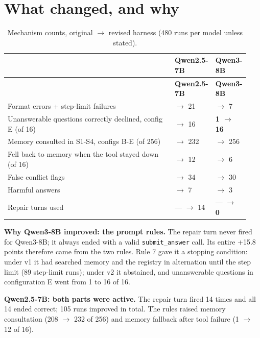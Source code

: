 \documentclass[10.5pt,a4paper,oneside]{report}
\begin{document}
\section{What changed, and why}
\begingroup\small\setlength{\tabcolsep}{4pt}\renewcommand{\arraystretch}{1.18}
\begin{longtable}{>{\raggedright\arraybackslash}p{0.693\linewidth}>{\raggedright\arraybackslash}p{0.130\linewidth}>{\raggedright\arraybackslash}p{0.118\linewidth}}
\caption{Mechanism counts, original $\rightarrow$ revised harness (480 runs per model unless stated).}\\
\toprule
\textbf{} & \textbf{Qwen2.5-7B} & \textbf{Qwen3-8B} \\
\midrule
\endfirsthead
\toprule
\textbf{} & \textbf{Qwen2.5-7B} & \textbf{Qwen3-8B} \\
\midrule
\endhead
\bottomrule
\endlastfoot
Format errors + step-limit failures & 104 $\rightarrow$ 21 & 117 $\rightarrow$ 7 \\
Unanswerable questions correctly declined, config E (of 16) & 15 $\rightarrow$ 16 & \textbf{1 $\rightarrow$ 16} \\
Memory consulted in S1-S4, configs B-E (of 256) & 208 $\rightarrow$ 232 & 256 $\rightarrow$ 256 \\
Fell back to memory when the tool stayed down (of 16) & 1 $\rightarrow$ 12 & 0 $\rightarrow$ 6 \\
False conflict flags & 14 $\rightarrow$ 34 & 16 $\rightarrow$ 30 \\
Harmful answers & 1 $\rightarrow$ 7 & 7 $\rightarrow$ 3 \\
Repair turns used & — $\rightarrow$ 14 & — $\rightarrow$ \textbf{0} \\
\end{longtable}
\endgroup

\textbf{Why Qwen3-8B improved: the prompt rules.} The repair turn never fired for Qwen3-8B; it always ended with a valid \texttt{submit\_\allowbreak{}answer} call. Its entire +15.8 points therefore came from the two rules. Rule 7 gave it a stopping condition: under v1 it had searched memory and the registry in alternation until the step limit (89 step-limit runs); under v2 it abstained, and unanswerable questions in configuration E went from 1 to 16 of 16.

\textbf{Qwen2.5-7B: both parts were active.} The repair turn fired 14 times and all 14 ended correct; 105 runs improved in total. The rules raised memory consultation (208 $\rightarrow$ 232 of 256) and memory fallback after tool failure (1 $\rightarrow$ 12 of 16).
\end{document}
